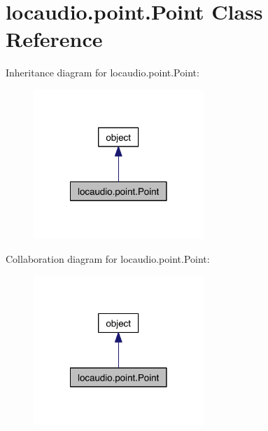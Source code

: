 \hypertarget{classlocaudio_1_1point_1_1Point}{\section{locaudio.\-point.\-Point Class Reference}
\label{classlocaudio_1_1point_1_1Point}
}


Inheritance diagram for locaudio.\-point.\-Point\-:
\nopagebreak
\begin{figure}[H]
\begin{center}
\leavevmode
\includegraphics[width=182pt]{classlocaudio_1_1point_1_1Point__inherit__graph}
\end{center}
\end{figure}


Collaboration diagram for locaudio.\-point.\-Point\-:
\nopagebreak
\begin{figure}[H]
\begin{center}
\leavevmode
\includegraphics[width=182pt]{classlocaudio_1_1point_1_1Point__coll__graph}
\end{center}
\end{figure}

